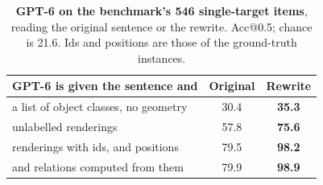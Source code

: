 \begin{table}[t]
\centering
\small
\setlength{\tabcolsep}{4.5pt}
\caption{\textbf{GPT-6 on the benchmark's 546 single-target items}, reading the original sentence or the rewrite. Acc@0.5; chance is 21.6. Ids and positions are those of the ground-truth instances.}
\label{tab:gpt6}
\begin{tabular}{@{}lcc@{}}
\toprule
GPT-6 is given the sentence and & Original & Rewrite \\
\midrule
a list of object classes, no geometry   & 30.4 & \textbf{35.3} \\
unlabelled renderings                   & 57.8 & \textbf{75.6} \\
renderings with ids, and positions      & 79.5 & \textbf{98.2} \\
\quad and relations computed from them  & 79.9 & \textbf{98.9} \\
\bottomrule
\end{tabular}
\end{table}
